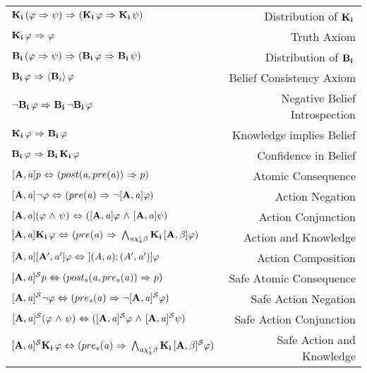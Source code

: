 \begin{table}[H]
\begin{center}
\begin{tabular}{| l r |}
	\hline
    $\Kns{i}(\varphi \iimplies \psi) \iimplies (\Kns{i}\varphi \iimplies \Kns{i}\psi)$ & Distribution of $\Kns{i}$ \\
    $\Kns{i}\varphi \iimplies \varphi$ & Truth Axiom \\
    $\Bels{i}(\varphi \iimplies \psi) \iimplies (\Bels{i}\varphi \iimplies \Bels{i}\psi)$ & Distribution of $\Bels{i}$\\
    $\Bels{i}\varphi \iimplies \BPoss{i}\varphi$ & Belief Consistency Axiom\\
    $\tlnot\Bels{i}\varphi \iimplies \Bels{i}\tlnot\Bels{i}\varphi$ & Negative Belief Introspection\\
    $\Kns{i}\varphi \iimplies \Bels{i}\varphi$ & Knowledge implies Belief \\
    $\Bels{i}\varphi \iimplies \Bels{i}\Kns{i}\varphi$ & Confidence in Belief\\
    $\Pal{A,\laa}p \iiff (post(\laa, pre(\laa)) \iimplies p)$ & Atomic Consequence\\
    $\Pal{A,\laa}\tlnot \varphi \iiff (pre(\laa) \iimplies \tlnot \Pal{A,\laa}\varphi)$ & Action Negation\\
    $\Pal{A,\laa}(\varphi \tland \psi) \iiff (\Pal{A,\laa}\varphi \tland \Pal{A,\laa}\psi)$ & Action Conjunction\\
    $\Pal{A,\laa}\Kns{i}\varphi \iiff (pre(\laa)\iimplies \bigwedge_{\laa\chi_{k}^i\beta}\Kns{i}\Pal{A,\beta}\varphi)$ & Action and Knowledge\\
    $\Pal{A,\laa}\Pal{A',\laa'}\varphi \iiff [(A,\laa);(A',\laa')]\varphi$ & Action Composition \\
    $\SPal{A,\laa}p \iiff (post_s(\laa, pre_s(\laa)) \iimplies p)$ & Safe Atomic Consequence\\
    $\SPal{A,\laa}\tlnot \varphi \iiff (pre_s(\laa) \iimplies \tlnot \SPal{A,\laa}\varphi)$ & Safe Action Negation\\
    $\SPal{A,\laa}(\varphi \tland \psi) \iiff (\SPal{A,\laa}\varphi \tland \SPal{A,\laa}\psi)$ & Safe Action Conjunction\\
    $\SPal{A,\laa}\Kns{i}\varphi \iiff (pre_s(\laa)\iimplies \bigwedge_{\laa\chi_{k}^i\beta}\Kns{i}\SPal{A,\beta}\varphi)$ & Safe Action and Knowledge\\

\end{tabular}
\end{center}
\end{table}

